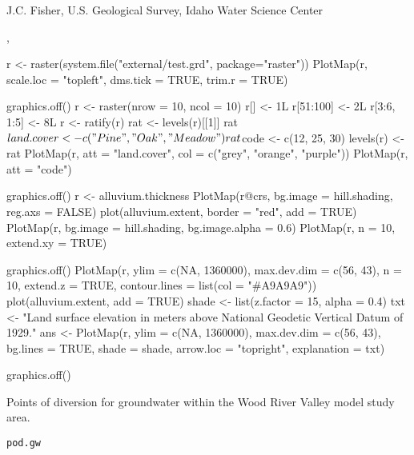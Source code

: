 \documentclass[a4paper]{book}
\begin{document}
%
\begin{Author}\relax
J.C. Fisher, U.S. Geological Survey, Idaho Water Science Center
\end{Author}
%
\begin{SeeAlso}\relax
{}, 
\end{SeeAlso}
%
\begin{Examples}
\begin{ExampleCode}
r <- raster(system.file("external/test.grd", package="raster"))
PlotMap(r, scale.loc = "topleft", dms.tick = TRUE, trim.r = TRUE)

graphics.off()
r <- raster(nrow = 10, ncol = 10)
r[] <- 1L
r[51:100] <- 2L
r[3:6, 1:5] <- 8L
r <- ratify(r)
rat <- levels(r)[[1]]
rat$land.cover <- c("Pine", "Oak", "Meadow")
rat$code <- c(12, 25, 30)
levels(r) <- rat
PlotMap(r, att = "land.cover", col = c("grey", "orange", "purple"))
PlotMap(r, att = "code")

graphics.off()
r <- alluvium.thickness
PlotMap(r@crs, bg.image = hill.shading, reg.axs = FALSE)
plot(alluvium.extent, border = "red", add = TRUE)
PlotMap(r, bg.image = hill.shading, bg.image.alpha = 0.6)
PlotMap(r, n = 10, extend.xy = TRUE)

graphics.off()
PlotMap(r, ylim = c(NA, 1360000), max.dev.dim = c(56, 43), n = 10, extend.z = TRUE,
        contour.lines = list(col = "#A9A9A9"))
plot(alluvium.extent, add = TRUE)
shade <- list(z.factor = 15, alpha = 0.4)
txt <- "Land surface elevation in meters above National Geodetic Vertical Datum of 1929."
ans <- PlotMap(r, ylim = c(NA, 1360000), max.dev.dim = c(56, 43), bg.lines = TRUE,
               shade = shade, arrow.loc = "topright", explanation = txt)

graphics.off()
\end{ExampleCode}
\end{Examples}
%
\begin{Description}\relax
Points of diversion for groundwater within the Wood River Valley model study area.
\end{Description}
%
\begin{Usage}
\begin{verbatim}
pod.gw
\end{verbatim}
\end{Usage}
%
\end{document}
